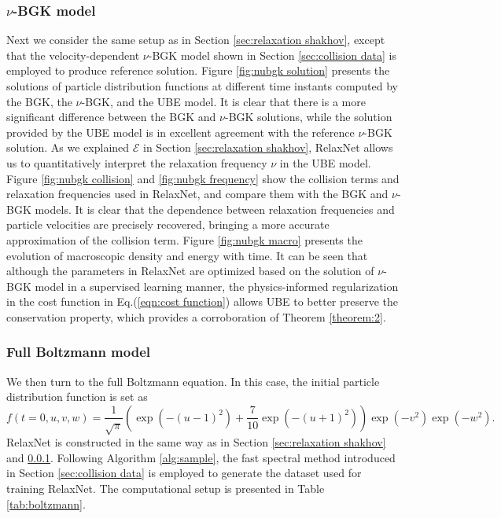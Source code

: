 \documentclass[preprint,3p,12pt,sort&compress]{elsarticle}
\begin{document}
\subsubsection{$\nu$-BGK model}\label{sec:relaxation nubgk}

Next we consider the same setup as in Section \ref{sec:relaxation shakhov}, except that the velocity-dependent $\nu$-BGK model shown in Section \ref{sec:collision data} is employed to produce reference solution.
Figure \ref{fig:nubgk solution} presents the solutions of particle distribution functions at different time instants computed by the BGK, the $\nu$-BGK, and the UBE model.
It is clear that there is a more significant difference between the BGK and $\nu$-BGK solutions, while the solution provided by the UBE model is in excellent agreement with the reference $\nu$-BGK solution.
As we explained $\mathcal E$ in Section \ref{sec:relaxation shakhov}, RelaxNet allows us to quantitatively interpret the relaxation frequency $\nu$ in the UBE model.
Figure \ref{fig:nubgk collision} and \ref{fig:nubgk frequency} show the collision terms and relaxation frequencies used in RelaxNet, and compare them with the BGK and $\nu$-BGK models.
It is clear that the dependence between relaxation frequencies and particle velocities are precisely recovered, bringing a more accurate approximation of the collision term.
Figure \ref{fig:nubgk macro} presents the evolution of macroscopic density and energy with time.
It can be seen that although the parameters in RelaxNet are optimized based on the solution of $\nu$-BGK model in a supervised learning manner, the physics-informed regularization in the cost function in Eq.(\ref{eqn:cost function}) allows UBE to better preserve the conservation property, which provides a corroboration of Theorem \ref{theorem:2}.

\subsubsection{Full Boltzmann model}

We then turn to the full Boltzmann equation.
In this case, the initial particle distribution function is set as
\begin{equation*}
    f(t=0,u,v,w) = \frac{1}{\sqrt{\pi}} \left( \exp\left(-\left(u-1\right)^2\right) + \frac{7}{10}\exp\left(-(u+1)^2 \right) \right) \exp\left(-v^2\right) \exp\left(-w^2\right)  .
\end{equation*}
RelaxNet is constructed in the same way as in Section \ref{sec:relaxation shakhov} and \ref{sec:relaxation nubgk}.
Following Algorithm \ref{alg:sample}, the fast spectral method introduced in Section \ref{sec:collision data} is employed to generate the dataset used for training RelaxNet.
The computational setup is presented in Table \ref{tab:boltzmann}.
\end{document}
